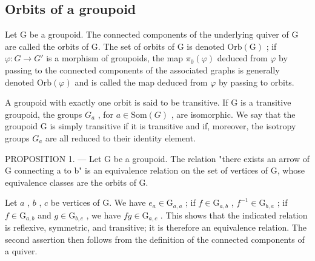\subsection{Orbits of a groupoid}

Let G be a groupoid. The connected components of the underlying quiver of G are called the orbits of G. The set of orbits of G is denoted \(\mathrm{Orb}(\mathrm{G})\) ; if \(\varphi: G \to G'\) is a morphism of groupoids, the map \(\pi_{0}(\varphi)\) deduced from \(\varphi\) by passing to the connected components of the associated graphs is generally denoted \(\mathrm{Orb}(\varphi)\) and is called the map deduced from \(\varphi\) by passing to orbits.

A groupoid with exactly one orbit is said to be transitive. If G is a transitive groupoid, the groups \(G_{a}\) , for \(a \in \text{Som}(G)\) , are isomorphic. We say that the groupoid G is simply transitive if it is transitive and if, moreover, the isotropy groups \(G_{a}\) are all reduced to their identity element.

PROPOSITION 1. --- Let G be a groupoid. The relation "there exists an arrow of G connecting a to b" is an equivalence relation on the set of vertices of G, whose equivalence classes are the orbits of G.

Let \(a\) , \(b\) , \(c\) be vertices of G. We have \(e_a \in \mathrm{G}_{a,a}\) ; if \(f \in \mathrm{G}_{a,b}\) , \(f^{-1} \in \mathrm{G}_{b,a}\) ; if \(f \in \mathrm{G}_{a,b}\) and \(g \in \mathrm{G}_{b,c}\) , we have \(fg \in \mathrm{G}_{a,c}\) . This shows that the indicated relation is reflexive, symmetric, and transitive; it is therefore an equivalence relation. The second assertion then follows from the definition of the connected components of a quiver.

